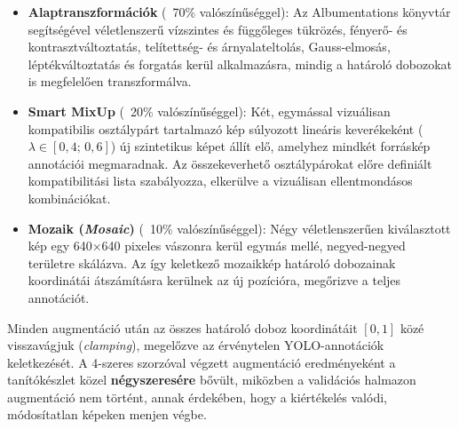     \begin{itemize}
        \item \textbf{Alaptranszformációk} (~70\% valószínűséggel): Az Albumentations könyvtár
        segítségével véletlenszerű vízszintes és függőleges tükrözés, fényerő- és
        kontrasztváltoztatás, telítettség- és árnyalateltolás, Gauss-elmosás, léptékváltoztatás
        és forgatás kerül alkalmazásra, mindig a határoló dobozokat is megfelelően transzformálva.

        \item \textbf{Smart MixUp} (~20\% valószínűséggel): Két, egymással vizuálisan kompatibilis
        osztálypárt tartalmazó kép súlyozott lineáris keverékeként (\(\lambda \in [0{,}4;\,0{,}6]\))
        új szintetikus képet állít elő, amelyhez mindkét forráskép annotációi megmaradnak.
        Az összekeverhető osztálypárokat előre definiált kompatibilitási lista szabályozza,
        elkerülve a vizuálisan ellentmondásos kombinációkat.

        \item \textbf{Mozaik (\textit{Mosaic})} (~10\% valószínűséggel): Négy véletlenszerűen
        kiválasztott kép egy 640×640 pixeles vászonra kerül egymás mellé, negyed-negyed területre
        skálázva. Az így keletkező mozaikkép határoló dobozainak koordinátái átszámításra kerülnek
        az új pozícióra, megőrizve a teljes annotációt.
    \end{itemize}

    Minden augmentáció után az összes határoló doboz koordinátáit $[0, 1]$ közé visszavágjuk
    (\textit{clamping}), megelőzve az érvénytelen YOLO-annotációk keletkezését. A 4-szeres
    szorzóval végzett augmentáció eredményeként a tanítókészlet közel \textbf{négyszeresére}
    bővült, miközben a validációs halmazon augmentáció nem történt, annak érdekében, hogy
    a kiértékelés valódi, módosítatlan képeken menjen végbe.


